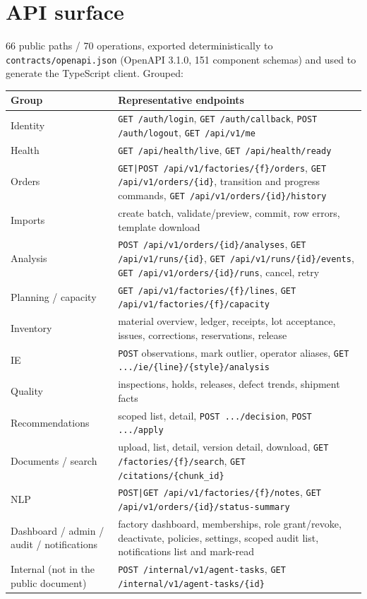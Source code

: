 \documentclass[11pt,a4paper]{article}
\begin{document}
\clearpage
\section{API surface}

66 public paths / 70 operations, exported deterministically to
\texttt{contracts/openapi.json} (OpenAPI 3.1.0, 151 component schemas) and used
to generate the TypeScript client. Grouped:

\begin{table}[h]
\centering\small
\begin{tabularx}{\linewidth}{@{}L{3.0cm}Y@{}}
\toprule
\textbf{Group} & \textbf{Representative endpoints}\\
\midrule
Identity & \texttt{GET /auth/login}, \texttt{GET /auth/callback}, \texttt{POST /auth/logout}, \texttt{GET /api/v1/me}\\
Health & \texttt{GET /api/health/live}, \texttt{GET /api/health/ready}\\
Orders & \texttt{GET|POST /api/v1/factories/\{f\}/orders}, \texttt{GET /api/v1/orders/\{id\}}, transition and progress commands, \texttt{GET /api/v1/orders/\{id\}/history}\\
Imports & create batch, validate/preview, commit, row errors, template download\\
Analysis & \texttt{POST /api/v1/orders/\{id\}/analyses}, \texttt{GET /api/v1/runs/\{id\}}, \texttt{GET /api/v1/runs/\{id\}/events}, \texttt{GET /api/v1/orders/\{id\}/runs}, cancel, retry\\
Planning / capacity & \texttt{GET /api/v1/factories/\{f\}/lines}, \texttt{GET /api/v1/factories/\{f\}/capacity}\\
Inventory & material overview, ledger, receipts, lot acceptance, issues, corrections, reservations, release\\
IE & \texttt{POST} observations, mark outlier, operator aliases, \texttt{GET .../ie/\{line\}/\{style\}/analysis}\\
Quality & inspections, holds, releases, defect trends, shipment facts\\
Recommendations & scoped list, detail, \texttt{POST .../decision}, \texttt{POST .../apply}\\
Documents / search & upload, list, detail, version detail, download, \texttt{GET /factories/\{f\}/search}, \texttt{GET /citations/\{chunk\_id\}}\\
NLP & \texttt{POST|GET /api/v1/factories/\{f\}/notes}, \texttt{GET /api/v1/orders/\{id\}/status-summary}\\
Dashboard / admin / audit / notifications & factory dashboard, memberships, role grant/revoke, deactivate, policies, settings, scoped audit list, notifications list and mark-read\\
Internal (not in the public document) & \texttt{POST /internal/v1/agent-tasks}, \texttt{GET /internal/v1/agent-tasks/\{id\}}\\
\bottomrule
\end{tabularx}
\end{table}
\end{document}
